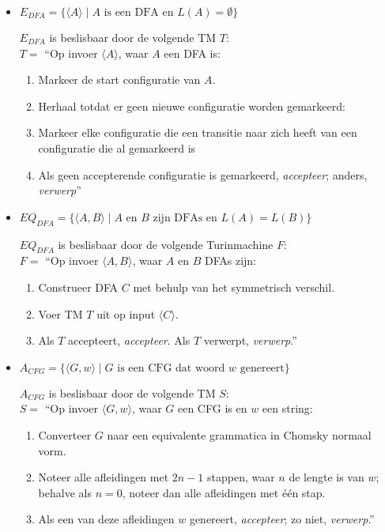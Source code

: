\documentclass[]{article}
\begin{document}
\begin{itemize}
	
	\item $E_{DFA} = \{ \langle A \rangle \mid A \mbox{ is een DFA en } L(A) = \emptyset \}$
	
	$E_{DFA}$ is beslisbaar door de volgende TM $T$: \\
	$T = $ ``Op invoer $\langle A \rangle$, waar $A$ een DFA is:
	\begin{enumerate}
		\item Markeer de start configuratie van $A$.
		\item Herhaal totdat er geen nieuwe configuratie worden gemarkeerd:
		\item \hspace*{3mm} Markeer elke configuratie die een transitie naar zich heeft van een configuratie die al gemarkeerd is
		\item Als geen accepterende configuratie is gemarkeerd, \emph{accepteer}; anders, \emph{verwerp}''
	\end{enumerate}
	
	\item $EQ_{DFA} = \{ \langle A, B \rangle \mid \mbox{$A$ en $B$ zijn DFAs en } L(A) = L(B) \}$ 
	
	$EQ_{DFA}$ is beslisbaar door de volgende Turinmachine $F$: \\
	$F = $ ``Op invoer $\langle A, B \rangle$, waar $A$ en $B$ DFAs zijn:
	\begin{enumerate}
		\item Construeer DFA $C$ met behulp van het symmetrisch verschil.
		\item Voer TM $T$ uit op input $\langle C \rangle$.
		\item Als $T$ accepteert, \emph{accepteer}. Als $T$ verwerpt, \emph{verwerp}.''
	\end{enumerate}
	
	
	\item $A_{CFG} = \{ \langle G, w \rangle \mid G \mbox{ is een CFG dat woord $w$ genereert} \}$
	
	$A_{CFG}$ is beslisbaar door de volgende TM $S$: \\
	$S = $ ``Op invoer $\langle G, w \rangle$, waar $G$ een CFG is en $w$ een string:
	\begin{enumerate}
		\item Converteer $G$ naar een equivalente grammatica in Chomsky normaal vorm.
		\item Noteer alle afleidingen met $2n -1$ stappen, waar $n$ de lengte is van $w$; behalve als $n = 0$, noteer dan alle afleidingen met \'{e}\'{e}n stap.
		\item Als een van deze afleidingen $w$ genereert, \emph{accepteer}; zo niet, \emph{verwerp}.''
	\end{enumerate}
	

\end{itemize}
\end{document}

